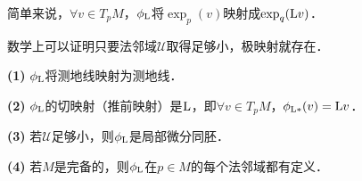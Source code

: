 简单来说，$\forall v\in T_p M$，$\phi_{\rm L}$将$\exp_p(v)$映射成$\exp_q({\rm L}v)$．

数学上可以证明只要法邻域$\mathscr{U}$取得足够小，极映射就存在．


\begin{proposition}\label{chhss:thm_plphi}
    {\bfseries (1)} $\phi_{\rm L}$将测地线映射为测地线． %
    
    {\bfseries (2)} $\phi_{\rm L}$的切映射（推前映射）是$\rm L$，即$\forall v\in T_pM$，$\phi_{{\rm L}*} (v) = {\rm L}v$．
    
    {\bfseries (3)} 若$\mathscr{U}$足够小，则$\phi_{\rm L}$是局部微分同胚．
    
    {\bfseries (4)} 若$M$是完备的，则$\phi_{\rm L}$在$p\in M$的每个法邻域都有定义．
\end{proposition}
